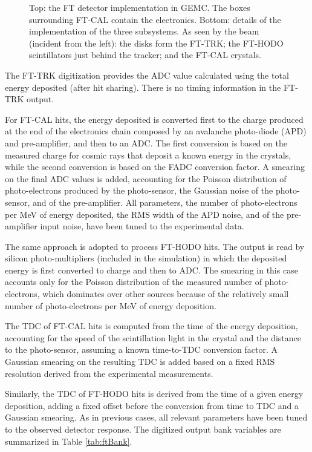\begin{figure}
	\caption{Top: the FT detector implementation in GEMC. The boxes surrounding FT-CAL contain the electronics.
			 Bottom: details of the implementation of the three subsystems. As seen by the beam (incident from the left):
             the disks form the FT-TRK; the FT-HODO scintillators just behind the tracker;
			 and the FT-CAL crystals. }
	\label{fig:ftGeometry}
\end{figure}

The FT-TRK digitization provides the ADC value calculated using the total energy deposited (after hit sharing).
There is no timing information in the FT-TRK output.

For FT-CAL hits, the energy deposited is converted first to the charge produced at the end of the electronics chain composed
by an avalanche photo-diode (APD) and pre-amplifier, and then to an ADC.
The first conversion is based on the measured charge for cosmic rays that deposit a known energy in the crystals,
while the second conversion is based on the FADC conversion factor. A smearing on the final ADC values is added,
accounting for the Poisson distribution of photo-electrons produced by the photo-sensor, the Gaussian noise of the
photo-sensor, and of the pre-amplifier. All parameters, the number of photo-electrons per MeV of energy deposited,
the RMS width of the APD noise, and of the pre-amplifier input noise, have been tuned to the experimental data.

The same approach is adopted to process FT-HODO hits. The output is read by silicon photo-multipliers
(included in the simulation) in which the deposited energy is first converted to charge and
then to ADC.
The smearing in this case accounts only for the Poisson distribution of the measured number of photo-electrons,
which dominates over other sources because of the relatively small number of photo-electrons per MeV of energy deposition.

The TDC of FT-CAL hits is computed from the time of the energy deposition, accounting for the speed of the scintillation light in
the crystal and the distance to the photo-sensor, assuming a known time-to-TDC conversion factor. A Gaussian smearing on the
resulting TDC is added based on a fixed RMS resolution derived from the experimental measurements.

Similarly, the TDC of FT-HODO hits is derived from the time of a given energy deposition, adding a fixed offset before the
conversion from time to TDC and a Gaussian smearing. As in previous cases, all relevant parameters have been tuned to the
observed detector response.
The digitized output bank variables are summarized in Table \ref{tab:ftBank}.

